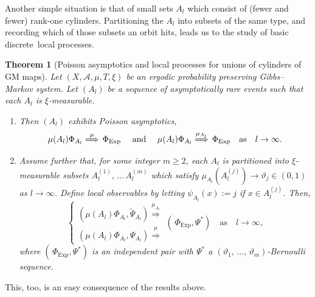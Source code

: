 \documentclass[10pt]{amsart}
\newtheorem{theo}{Theorem}[section]
\theoremstyle{definition}\newtheorem{defi}[theo]{Definition}\newtheorem{rema}[theo]{Remark}\newtheorem{exam}[theo]{Example}\newtheorem{exem}[theo]{Example}\newtheorem{nota}[theo]{Notation}
\newcommand{\clA}{\mathcal{A}}
\newcommand{\Expl}{\mathrm{Exp}}
\newcommand*{\alphenumi}{\renewcommand*{\theenumi}{\alph{enumi}}}
\begin{document}
Another simple situation is that of small sets $A_{l}$ which consist of (fewer and fewer) rank-one cylinders. Partitioning the $A_{l}$ into subsets of the same type, and recording which of those subsets an orbit hits, leads us to the study of basic discrete\ local processes.

\begin{theo}[{Poisson asymptotics and local processes for unions of cylinders of GM maps}]\label{T_PoissonAsyGMUnionCyls}
Let $(X,\clA,\mu,T,\xi)$ be an ergodic probability preserving Gibbs--Markov system. Let $(A_{l})$ be a sequence of asymptotically rare events such that each $A_{l}$ is $\xi $-measurable.
\begin{enumerate}\alphenumi
\item\label{theo10.2.a} Then $(A_{l})$ exhibits Poisson asymptotics,
\begin{equation}\label{Eq_tptptptptptpt}
\mu(A_{l})\Phi_{A_{l}}\overset{\mu}{\Longrightarrow}\,\Phi_{\Expl }\text{ \quad and \quad}\mu(A_{l})\Phi_{A_{l}}\overset{\mu_{A_{l}} }{\Longrightarrow}\,\Phi_{\Expl}\quad\text{as}\quad l\rightarrow
\infty.
\end{equation}
\item\label{theo10.2.b} Assume further that, for some integer $m\geq2$, each $A_{l}$ is partitioned into $\xi$-measurable subsets $A_{l}^{(1)},\,\ldots\,A_{l}^{(m)}$ which satisfy $\mu_{A_{l}}(A_{l}^{(j)})\rightarrow\vartheta_{j}\in(0,1)$ as $l\rightarrow\infty$. Define local observables by letting $\psi_{A_{l}}(x):=j$ if $x\in A_{l}^{(j)}$. Then,
\begin{equation}\label{Eq_GMJointLimits}
\begin{cases}
\left(\mu(A_{l})\Phi_{A_{l}},\widetilde{\Psi}_{A_{l}}\right)\overset{\mu_{A_{l}} }{\Longrightarrow}\\
\left(\mu(A_{l})\Phi_{A_{l}},\Psi_{A_{l}}\right)\overset{\mu}{\Longrightarrow}
\end{cases}
\left(\,\Phi_{\Expl},\Psi^{\ast}\right)\quad\text{as}\quad l\rightarrow
\infty, 
\end{equation}
where $(\,\Phi_{\Expl},\Psi^{\ast})$ is an independent pair with $\Psi^{\ast}$ a $(\vartheta_{1},\,\ldots,\,\vartheta_{m})$-Bernoulli sequence.
\end{enumerate}
\end{theo}

This, too, is an easy consequence of the results above.
\end{document}

